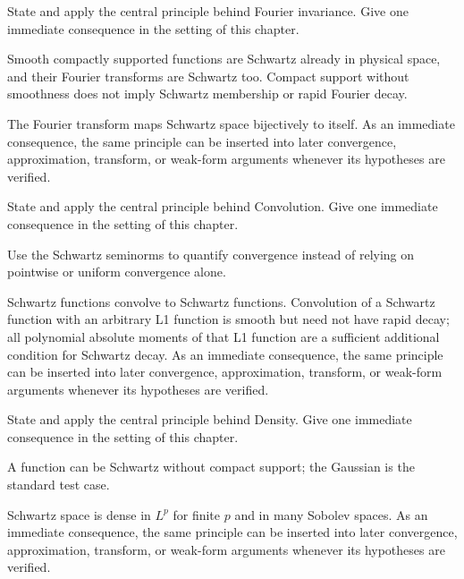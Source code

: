 \begin{exercise}\label{exr:iii14-05}
State and apply the central principle behind Fourier invariance. Give one immediate consequence in the setting of this chapter.
\end{exercise}
\begin{hint}
Smooth compactly supported functions are Schwartz already in physical space, and their Fourier transforms are Schwartz too. Compact support without smoothness does not imply Schwartz membership or rapid Fourier decay.
\end{hint}
\begin{solution}
The Fourier transform maps Schwartz space bijectively to itself. As an immediate consequence, the same principle can be inserted into later convergence, approximation, transform, or weak-form arguments whenever its hypotheses are verified.
\end{solution}

\begin{exercise}\label{exr:iii14-06}
State and apply the central principle behind Convolution. Give one immediate consequence in the setting of this chapter.
\end{exercise}
\begin{hint}
Use the Schwartz seminorms to quantify convergence instead of relying on pointwise or uniform convergence alone.
\end{hint}
\begin{solution}
Schwartz functions convolve to Schwartz functions. Convolution of a Schwartz function with an arbitrary L1 function is smooth but need not have rapid decay; all polynomial absolute moments of that L1 function are a sufficient additional condition for Schwartz decay. As an immediate consequence, the same principle can be inserted into later convergence, approximation, transform, or weak-form arguments whenever its hypotheses are verified.
\end{solution}

\begin{exercise}\label{exr:iii14-07}
State and apply the central principle behind Density. Give one immediate consequence in the setting of this chapter.
\end{exercise}
\begin{hint}
A function can be Schwartz without compact support; the Gaussian is the standard test case.
\end{hint}
\begin{solution}
Schwartz space is dense in $L^p$ for finite $p$ and in many Sobolev spaces. As an immediate consequence, the same principle can be inserted into later convergence, approximation, transform, or weak-form arguments whenever its hypotheses are verified.
\end{solution}

